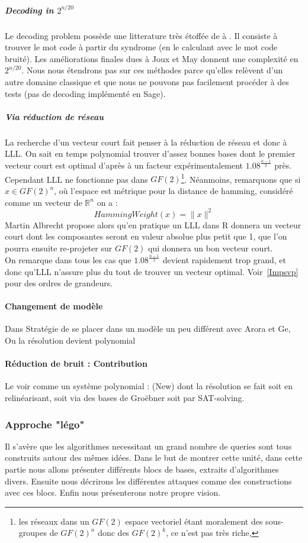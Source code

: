 \documentclass{article}		%
\theoremstyle{definition}
\theoremstyle{plain}
\begin{document}
\subparagraph{Decoding in $2^{n/20}$} 
Le decoding problem possède une litterature très étoffée de \cite{Stern}
à \cite{Joux}. Il consiste à trouver le mot code à partir du syndrome (en
le calculant avec le mot code bruité). Les améliorations finales dues à
Joux et May donnent une complexité en $2^{n/20}$. Nous nous étendrons
pas sur ces méthodes parce qu'elles relèvent d'un autre domaine classique
et que nous ne pouvons pas facilement procéder à des tests (pas de
decoding implémenté en Sage).

\subparagraph{Via réduction de réseau} 
La recherche d'un vecteur court fait penser à la réduction de réseau et
donc à LLL. On sait en temps polynomial trouver d'assez bonnes bases dont
le premier vecteur court est optimal d'après \cite{Phong} à un facteur expérimentalement
$1.08^{\frac {n-1} 2}$ près.
Cependant LLL ne fonctionne pas dans $GF(2)$\footnote{les réseaux dans un
$GF(2)$ espace vectoriel étant moralement des sous-groupes de $GF(2)^n$
donc des $GF(2)^k$, ce n'est pas très riche, }. Néanmoins, remarquons que
si 
 $x\in GF(2)^n$, où l'espace est métrique pour la distance de hamming, considéré comme un vecteur de $\mathbb{R}^n$ on a :
$$HammingWeight(x)=\| x \| ^2$$  
 Martin Albrecht propose alors qu'en pratique un LLL dans R donnera un
vecteur court dont les composantes seront en valeur absolue plus petit
que 1, que l'on pourra ensuite re-projeter sur $GF(2)$ qui donnera un bon
vecteur court.
\\
On remarque dans tous les cas que $1.08^{\frac {n-1} {2}}$ devient
rapidement trop grand, et donc qu'LLL n'assure plus du tout de trouver un
vecteur optimal. Voir~\ref{Impsvp} pour des ordres de grandeurs.

\paragraph{Changement de modèle} Dans \cite{Arora} Stratégie de se placer dans un modèle un peu différent avec Arora et Ge, Ou la résolution devient polynomial 

\paragraph{Réduction de bruit : Contribution}\label{SAT}
Le voir comme un système polynomial : (New) dont la résolution se fait
soit en relinéarisant, soit via des bases de
Groëbner soit par
SAT-solving. 

\subsubsection{Approche "légo"}
Il s'avère que les algorithmes  necessitant un grand nombre
de queries sont tous construits autour des mêmes idées. Dans le but de
montrer cette unité, dans cette partie nous allons présenter différents
blocs de bases, extraits d'algorithmes divers. Ensuite nous décrirons les
différentes attaques comme des constructions avec ces blocs. Enfin nous
présenterons notre propre vision.  
\end{document}
